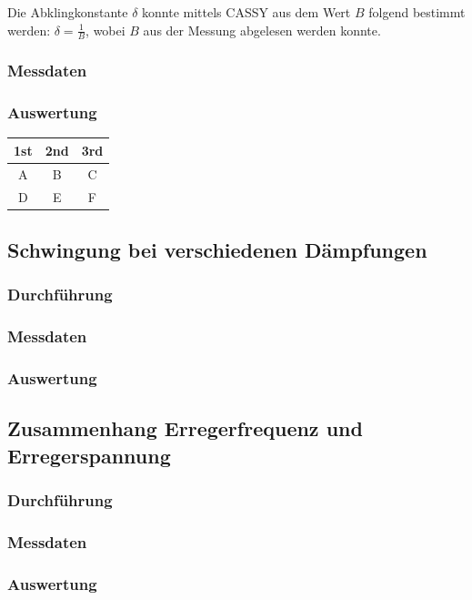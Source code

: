 \documentclass{article}
\begin{document}
Die Abklingkonstante $\delta$ konnte mittels CASSY aus dem Wert $B$ folgend
bestimmt werden: $\delta = \frac{1}{B}$, wobei $B$ aus der Messung abgelesen werden konnte.
\subsubsection{Messdaten}

\subsubsection{Auswertung}
\begin{center}
\begin{tabular}{c c c}
    \hline
    1st & 2nd & 3rd \\
    \hline
    A & B & C \\
    D & E & F \\
    \hline
\end{tabular}

\subsection{Schwingung bei verschiedenen Dämpfungen}
\subsubsection{Durchführung}
\subsubsection{Messdaten}
\subsubsection{Auswertung}

\subsection{Zusammenhang Erregerfrequenz und Erregerspannung}
\subsubsection{Durchführung}
\subsubsection{Messdaten}
\subsubsection{Auswertung}


\end{center}
\end{document}
